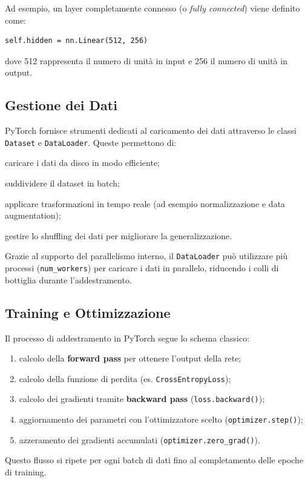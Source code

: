 Ad esempio, un layer completamente connesso (o \textit{fully connected}) viene definito come:
\begin{verbatim}
self.hidden = nn.Linear(512, 256)
\end{verbatim}
dove 512 rappresenta il numero di unità in input e 256 il numero di unità in output.

\subsection{Gestione dei Dati}
PyTorch fornisce strumenti dedicati al caricamento dei dati attraverso le classi \texttt{Dataset} e \texttt{DataLoader}. Queste permettono di:
\begin{compactitemize}
    \item caricare i dati da disco in modo efficiente;
    \item suddividere il dataset in batch;
    \item applicare trasformazioni in tempo reale (ad esempio normalizzazione e data augmentation);
    \item gestire lo shuffling dei dati per migliorare la generalizzazione.
\end{compactitemize}
Grazie al supporto del parallelismo interno, il \texttt{DataLoader} può utilizzare più processi (\texttt{num\_workers}) per caricare i dati in parallelo, riducendo i colli di bottiglia durante l'addestramento.

\subsection{Training e Ottimizzazione}
Il processo di addestramento in PyTorch segue lo schema classico:
\begin{enumerate}
    \item calcolo della \textbf{forward pass} per ottenere l'output della rete;
    \item calcolo della funzione di perdita (es. \texttt{CrossEntropyLoss});
    \item calcolo dei gradienti tramite \textbf{backward pass} (\texttt{loss.backward()});
    \item aggiornamento dei parametri con l'ottimizzatore scelto (\texttt{optimizer.step()});
    \item azzeramento dei gradienti accumulati (\texttt{optimizer.zero\_grad()}).
\end{enumerate}
Questo flusso si ripete per ogni batch di dati fino al completamento delle epoche di training.


